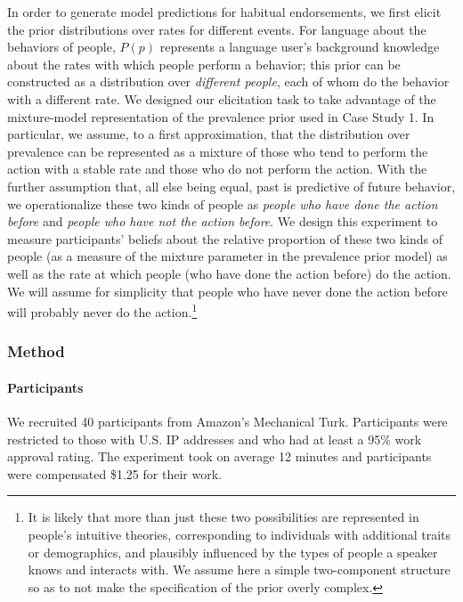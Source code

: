 \documentclass[english,,man,floatsintext]{apa6}
\let\oldparagraph\paragraph
\renewcommand{\paragraph}[1]{\oldparagraph{#1}\mbox{}}
\let\rmarkdownfootnote\footnote%
\def\footnote{\protect\rmarkdownfootnote}
\theoremstyle{definition}
\theoremstyle{definition}
\theoremstyle{definition}
\theoremstyle{remark}
\begin{document}
In order to generate model predictions for habitual endorsements, we
first elicit the prior distributions over rates for different events.
For language about the behaviors of people, \(P(p)\) represents a
language user's background knowledge about the rates with which people
perform a behavior; this prior can be constructed as a distribution over
\emph{different people}, each of whom do the behavior with a different
rate. We designed our elicitation task to take advantage of the
mixture-model representation of the prevalence prior used in Case Study
1. In particular, we assume, to a first approximation, that the
distribution over prevalence can be represented as a mixture of those
who tend to perform the action with a stable rate and those who do not
perform the action. With the further assumption that, all else being
equal, past is predictive of future behavior, we operationalize these
two kinds of people as \emph{people who have done the action before} and
\emph{people who have not the action before}. We design this experiment
to measure participants' beliefs about the relative proportion of these
two kinds of people (as a measure of the mixture parameter in the
prevalence prior model) as well as the rate at which people (who have
done the action before) do the action. We will assume for simplicity
that people who have never done the action before will probably never do
the action.\footnote{It is likely that more than just these two
  possibilities are represented in people's intuitive theories,
  corresponding to individuals with additional traits or demographics,
  and plausibly influenced by the types of people a speaker knows and
  interacts with. We assume here a simple two-component structure so as
  to not make the specification of the prior overly complex.}

\hypertarget{method-2}{%
\subsubsection{Method}\label{method-2}}

\hypertarget{participants-2}{%
\paragraph{Participants}\label{participants-2}}

We recruited 40 participants from Amazon's Mechanical Turk. Participants
were restricted to those with U.S. IP addresses and who had at least a
95\% work approval rating. The experiment took on average 12 minutes and
participants were compensated \$1.25 for their work.
\end{document}
